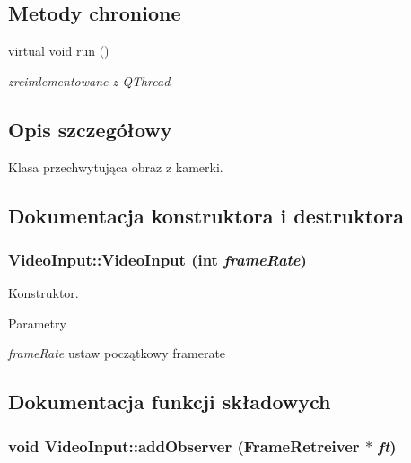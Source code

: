 \subsection*{Metody chronione}
\begin{DoxyCompactItemize}
\item 
virtual void \hyperlink{class_video_input_a653a4568756629a94a3b6e2697973864}{run} ()
\begin{DoxyCompactList}\small\item\em zreimlementowane z QThread \item\end{DoxyCompactList}\end{DoxyCompactItemize}


\subsection{Opis szczegółowy}
Klasa przechwytująca obraz z kamerki. 

\subsection{Dokumentacja konstruktora i destruktora}
\hypertarget{class_video_input_a136409a2c510d131dd25b00796ebb9a6}{
\subsubsection[{VideoInput}]{\setlength{\rightskip}{0pt plus 5cm}VideoInput::VideoInput (int {\em frameRate})}}
\label{class_video_input_a136409a2c510d131dd25b00796ebb9a6}


Konstruktor. 


\begin{DoxyParams}{Parametry}
\item[{\em frameRate}]ustaw początkowy framerate \end{DoxyParams}


\subsection{Dokumentacja funkcji składowych}
\hypertarget{class_video_input_ac2370a0c1ea0d4b1ce36c2f9678530a4}{
\subsubsection[{addObserver}]{\setlength{\rightskip}{0pt plus 5cm}void VideoInput::addObserver ({\bf FrameRetreiver} $\ast$ {\em ft})}}
\label{class_video_input_ac2370a0c1ea0d4b1ce36c2f9678530a4}


